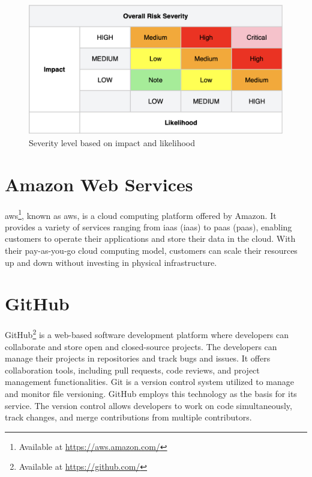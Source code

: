 \vspace{2mm}
\begin{figure}[H]
    \centering
    \includegraphics[scale=0.4]{Images/OWASP-severity.png}
    \caption{Severity level based on impact and likelihood}
    \label{fig: OWASP Severity Scale}
\end{figure}

\section{Amazon Web Services}
\acrlong{aws}\footnote{Available at \url{https://aws.amazon.com/}}, known as \acrshort{aws}, is a cloud computing platform offered by Amazon. It provides a variety of services ranging from \acrlong{iaas} (\acrshort{iaas}) to \acrlong{paas} (\acrshort{paas}), enabling customers to operate their applications and store their data in the cloud. With their pay-as-you-go cloud computing model, customers can scale their resources up and down without investing in physical infrastructure.\cite{aws}  

\section{GitHub}
GitHub\footnote{Available at \url{https://github.com/}} is a web-based software development platform where developers can collaborate and store open and closed-source projects. The developers can manage their projects in repositories and track bugs and issues. It offers collaboration tools, including pull requests, code reviews, and project management functionalities. Git is a version control system utilized to manage and monitor file versioning. GitHub employs this technology as the basis for its service. The version control allows developers to work on code simultaneously, track changes, and merge contributions from multiple contributors.\cite{github}
